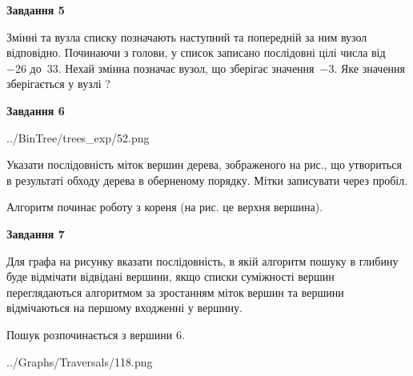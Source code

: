 \documentclass[12pt, ukrainian]{article}
\begin{document}
{\begin {large}
{\begin {center}\textbf{Завдання 5}\end {center}}\par
Змінні  та  вузла списку позначають наступний та попередній за ним вузол відповідно. Починаючи з голови, у список записано послідовні цілі числа від~$-26$ до~$33$. Нехай змінна  позначає вузол, що зберігає значення~$-3$.
Яке значення зберігається у вузлі  ?\par
\newpage

{\begin {center}\textbf{Завдання 6}\end {center}}\par

\begin{center}
	{../BinTree/trees_exp/52.png}
\end{center}
Указати послідовність міток вершин дерева, зображеного на рис., що утвориться в результаті обходу дерева в оберненому порядку. Мітки записувати через пробіл.\par Алгоритм починає роботу з кореня (на рис. це верхня вершина).\par
\newpage

{\begin {center}\textbf{Завдання 7}\end {center}}\par
Для графа на рисунку вказати послідовність, в якій алгоритм пошуку в глибину буде відмічати відвідані вершини, якщо списки суміжності вершин переглядаються алгоритмом за зростанням міток вершин та вершини відмічаються на першому вход\-женні у вершину.\par
Пошук розпочинається з вершини 6.\par

\begin{center}
	{../Graphs/Traversals/118.png}
\end{center}\par
\newpage


\end{large}}
\end{document}
